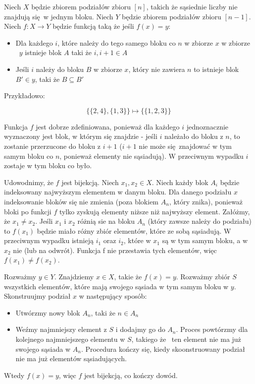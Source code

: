 \documentclass{mwart}
\begin{document}
\begin{mdframed}
    Niech $X$ będzie zbiorem podziałów zbioru $[n]$, takich że sąsiednie liczby nie
    znajdują się w jednym bloku. Niech $Y$ będzie zbiorem podziałów zbioru $[n - 1]$.
    Niech $ f : X \rightarrow Y$ będzie funkcją taką że jeśli $f(x) = y$:
    \begin{itemize}
        \item Dla każdego $i$, które należy do tego samego bloku co $n$ w zbiorze $x$ w zbiorze \
              $y$ istnieje blok $A$ taki że $i, i + 1 \in A$
        \item Jeśli $i$ należy do bloku $B$ w zbiorze $x$, który nie zawiera $n$ to istnieje blok \
              $B' \in y$, taki że $B \subseteq B'$
    \end{itemize}
    Przykładowo:

    $$\
        \{\{2, 4\}, \{1, 3\}\} \mapsto \{\{1, 2, 3\}\} \
    $$

    Funkcja $f$ jest dobrze zdefiniowana, ponieważ dla każdego $i$ jednoznacznie wyznaczony jest blok,
    w którym się znajdzie - jeśli $i$ należało do bloku z $n$, to zostanie przerzucone do bloku z $i + 1$
    ($i + 1$ nie może się znajdować w tym samym bloku co $n$, ponieważ elementy nie sąsiadują). W przeciwnym
    wypadku $i$ zostaje w tym bloku co było.

    Udowodnimy, że $f$ jest bijekcją. Niech $x_1, x_2 \in X$. Niech każdy blok $A_i$ będzie indeksowany najwyższym elementem
    w danym bloku. Dla danego podziału $x$ indeksowanie bloków się nie zmienia (poza blokiem $A_n$, który znika), ponieważ
    bloki po funkcji $f$ tylko zyskują elementy niższe niż najwyższy element. Załóżmy, że $x_1 \neq x_2$. Jeśli $x_1$ i $x_2$
    różnią sie na bloku $A_n$ (który zawsze należy do podziału) to $f(x_1)$ będzie miało różny zbiór elementów, które ze sobą sąsiadują.
    W przeciwnym wypadku istnieją $i_1$ oraz $i_2$, które w $x_1$ są w tym samym bloku, a w $x_2$ nie (lub na odwrót). Funkcja f nie
    przestawia tych elementów, więc $f(x_1) \neq f(x_2)$.

    Rozważmy $y \in Y$. Znajdziemy $x \in X$, takie że $f(x) = y$. Rozważmy zbiór $S$ wszystkich elementów, które mają swojego sąsiada w tym
    samym bloku w $y$. Skonstruujmy podział $x$ w następujący sposób:

    \begin{itemize}
        \item Utwórzmy nowy blok $A_n$, taki że $n \in A_n$
        \item Weźmy najmniejszy element z $S$ i dodajmy go do $A_n$. Proces powtórzmy dla kolejnego najmniejszego elementu w $S$, takiego że \
              ten element nie ma już swojego sąsiada w $A_n$. Procedura kończy się, kiedy skoonstruowany podział nie ma już elementów sąsiadujących.
    \end{itemize}

    Wtedy $f(x) = y$, więc $f$ jest bijekcją, co kończy dowód.

\end{mdframed}
\end{document}
